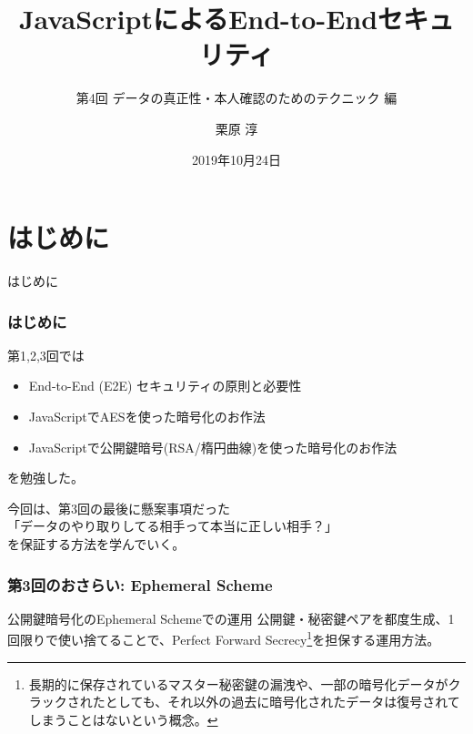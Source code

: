 \documentclass[12pt,dvipdfmx]{beamer}
\title[E2E Security with JS 04]{JavaScriptによるEnd-to-Endセキュリティ}
\subtitle{第4回 データの真正性・本人確認のためのテクニック 編}
\author[Jun Kurihara]{栗原 淳}
\institute[]{}
\date[Oct. 24, 2019]{2019年10月24日}
\begin{document}
\begin{frame}
\titlepage
\end{frame}

\section{はじめに}
\begin{frame}
 \centering
 {\Large はじめに}
\end{frame}

\begin{frame}
\frametitle{はじめに}
第1,2,3回では
\begin{itemize}
 \item End-to-End (E2E) セキュリティの原則と必要性
 \item JavaScriptでAESを使った暗号化のお作法
 \item JavaScriptで公開鍵暗号(RSA/楕円曲線)を使った暗号化のお作法
\end{itemize}
を勉強した。

\vspace{2ex}

今回は、第3回の最後に懸案事項だった\\
\alert{「データのやり取りしてる相手って本当に正しい相手？」}\\
を保証する方法を学んでいく。
\end{frame}


\begin{frame}
\frametitle{第3回のおさらい: Ephemeral Scheme}
\begin{block}{\small 公開鍵暗号化のEphemeral Schemeでの運用}
公開鍵・秘密鍵ペアを都度生成、1回限りで使い捨てることで、\alert{Perfect Forward Secrecy}\footnote[frame]{\scriptsize 長期的に保存されているマスター秘密鍵の漏洩や、一部の暗号化データがクラックされたとしても、\alert{それ以外の過去に暗号化されたデータは復号されてしまうことはない}という概念。}を担保する運用方法。
\end{block}
\end{frame}
\end{document}
